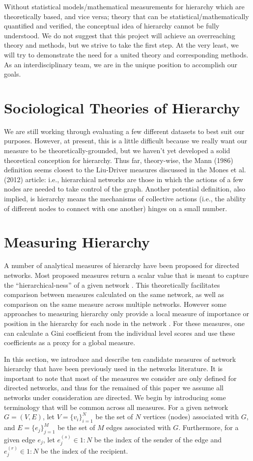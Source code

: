 \documentclass[3p,times]{elsarticle}
\begin{document}
Without statistical models/mathematical measurements for hierarchy which are theoretically based, and vice versa; theory that can be statistical/mathematically quantified and verified, the conceptual idea of hierarchy cannot be fully understood. We do not suggest that this project will achieve an overreaching theory and methods, but we strive to take the first step. At the very least, we will try to demonstrate the need for a united theory and corresponding methods. As an interdisciplinary team, we are in the unique position to accomplish our goals.
\section{Sociological Theories of Hierarchy}
	We are still working through evaluating a few different datasets to best suit our purposes. However, at present, this is a little difficult because we really want our measure to be theoretically-grounded, but we haven't yet developed a solid theoretical conception for hierarchy. Thus far, theory-wise, the Mann (1986) definition seems closest to the Liu-Driver measures discussed in the Mones et al. (2012) article: i.e., hierarchical networks are those in which the actions of a few nodes are needed to take control of the graph. Another potential definition, also implied, is hierarchy means the mechanisms of collective actions (i.e., the ability of different nodes to connect with one another) hinges on a small number.
\section{Measuring Hierarchy}
A number of analytical measures of hierarchy have been proposed for directed networks. Most proposed measures return a scalar value that is meant to capture the ``hierarchical-ness'' of a given network \cite{Mones2012, Shizuka2012, eigen, between,Kendall1940, landau, Suchecki2013a}. This theoretically facilitates comparison between measures calculated on the same network, as well as comparison on the same measure across multiple networks. However some approaches to measuring hierarchy only provide a local measure of importance or position in the hierarchy for each node in the network \cite{key}. For these measures, one can calculate a Gini coefficient \cite{Yitzhaki1979} from the individual level scores and use these coefficients as a proxy for a global measure. 

In this section, we introduce and describe ten candidate measures of network hierarchy that have been previously used in the networks literature. It is important to note that most of the measures we consider are only defined for directed networks, and thus for the remained of this paper we assume all networks under consideration are directed. We begin by introducing some terminology that will be common across all measures. For a given network $G=(V,E)$, let $V=\{v_i\}_{i=1}^N$ be the set of $N$ vertices (nodes) associated with $G$, and $E=\{e_j\}_{j=1}^M$ be the set of $M$ edges associated with $G$. Furthermore, for a given edge $e_j$, let $e_j^{(s)} \in 1:N$ be the index of the sender of the edge and $e_j^{(r)} \in 1:N$ be the index of the recipient. 
\end{document}
